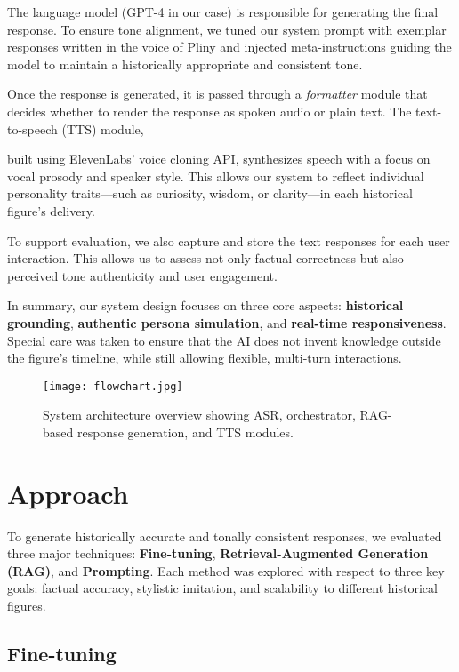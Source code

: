 \documentclass[sigconf]{aamas}
\begin{document}
The language model (GPT-4 in our case) is responsible for generating the final response. To ensure tone alignment, we tuned our system prompt with exemplar responses written in the voice of Pliny and injected meta-instructions guiding the model to maintain a historically appropriate and consistent tone.

Once the response is generated, it is passed through a \textit{formatter} module that decides whether to render the response as spoken audio or plain text. The text-to-speech (TTS) module,

built using ElevenLabs’ voice cloning API, synthesizes speech with a focus on vocal prosody and speaker style. This allows our system to reflect individual personality traits—such as curiosity, wisdom, or clarity—in each historical figure’s delivery.

To support evaluation, we also capture and store the text responses for each user interaction. This allows us to assess not only factual correctness but also perceived tone authenticity and user engagement.

In summary, our system design focuses on three core aspects: \textbf{historical grounding}, \textbf{authentic persona simulation}, and \textbf{real-time responsiveness}. Special care was taken to ensure that the AI does not invent knowledge outside the figure’s timeline, while still allowing flexible, multi-turn interactions.

\begin{figure}[h]
    \centering
    
    \texttt{[image: flowchart.jpg]}
    
    \caption{System architecture overview showing ASR, orchestrator, RAG-based response generation, and TTS modules.}
    
    \label{fig:architecture}
\end{figure}

\section{Approach}

To generate historically accurate and tonally consistent responses, we evaluated three major techniques: \textbf{Fine-tuning}, \textbf{Retrieval-Augmented Generation (RAG)}, and \textbf{Prompting}. Each method was explored with respect to three key goals: factual accuracy, stylistic imitation, and scalability to different historical figures.

\subsection{Fine-tuning}
\end{document}
